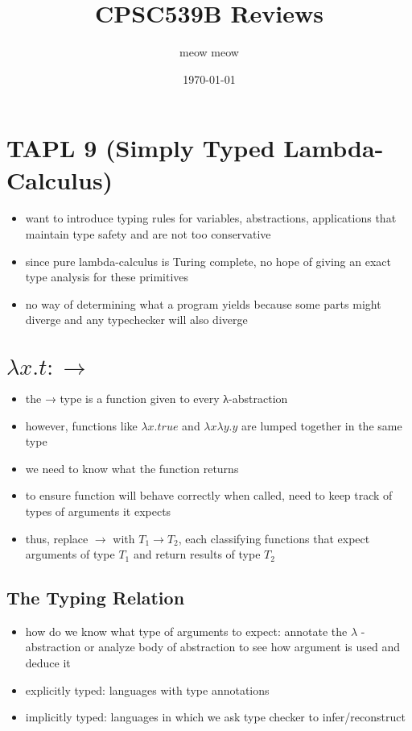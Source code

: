 \documentclass[11pt]{article}
\author{meow meow}
\date{\today}
\title{CPSC539B Reviews}
\begin{document}
\maketitle
\tableofcontents


\section{TAPL 9 (Simply Typed Lambda-Calculus)}
\label{sec:orgc550cd8}
\begin{itemize}
\item want to introduce typing rules for variables, abstractions, applications that maintain type safety and are not too conservative
\item since pure lambda-calculus is Turing complete, no hope of giving an exact type analysis for these primitives
\item no way of determining what a program yields because some parts might diverge and any typechecker will also diverge
\end{itemize}

\section{\(\lambda  x.t : \rightarrow\)}
\label{sec:org19a89d5}
\begin{itemize}
\item the → type is a function given to every λ-abstraction
\item however, functions like \(\lambda x.true\) and \(\lambda x \lambda y.y\) are lumped together in the same type
\item we need to know what the function returns
\item to ensure function will behave correctly when called, need to keep track of types of arguments it expects
\item thus, replace \(\rightarrow\) with \(T_1 \rightarrow T_2\), each classifying functions that expect arguments of type \(T_1\) and return results of type \(T_2\)
\end{itemize}

\subsection{The Typing Relation}
\label{sec:org039c683}
\begin{itemize}
\item how do we know what type of arguments to expect: annotate the \(\lambda\) -abstraction or analyze body of abstraction to see how argument is used and deduce it
\item explicitly typed: languages with type annotations
\item implicitly typed: languages in which we ask type checker to infer/reconstruct
\end{itemize}
\end{document}
